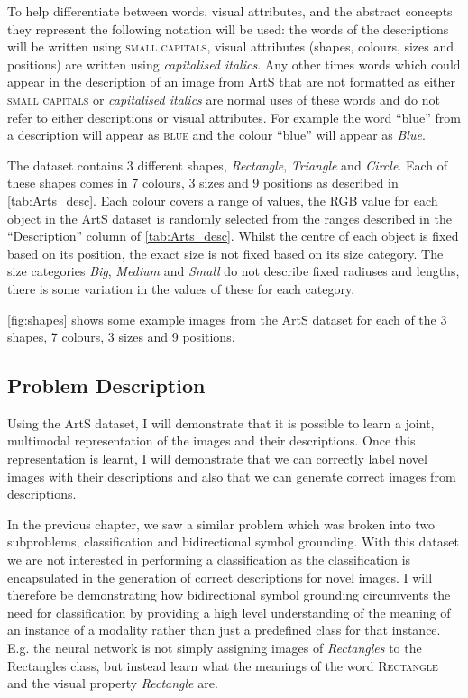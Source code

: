 To help differentiate between words, visual attributes, and the abstract concepts they represent the following notation will be used: the words of the descriptions will be written using \textsc{small capitals}, visual attributes (shapes, colours, sizes and positions) are written using \textit{capitalised italics}. Any other times words which could appear in the description of an image from ArtS that are not formatted as either \textsc{small capitals} or \textit{capitalised italics} are normal uses of these words and do not refer to either descriptions or visual attributes.
For example the word ``blue'' from a description will appear as \textsc{blue} and the colour ``blue'' will appear as \textit{Blue}. 


The dataset contains 3 different shapes, \textit{Rectangle}, \textit{Triangle} and \textit{Circle}. Each of these shapes comes in 7 colours, 3 sizes and 9 positions as described in \autoref{tab:Arts_desc}. Each colour covers a range of values, the RGB value for each object in the ArtS dataset is randomly selected from the ranges described in the ``Description'' column of \autoref{tab:Arts_desc}. Whilst the centre of each object is fixed based on its position, the exact size is not fixed based on its size category. The size categories \textit{Big}, \textit{Medium} and \textit{Small} do not describe fixed radiuses and lengths, there is some variation in the values of these for each category.


\autoref{fig:shapes} shows some example images from the ArtS dataset for each of the 3 shapes, 7 colours, 3 sizes and 9 positions.

\subsection{Problem Description}
Using the ArtS dataset, I will demonstrate that it is possible to learn a joint, multimodal representation of the images and their descriptions. Once this representation is learnt, I will demonstrate that we can correctly label novel images with their descriptions and also that we can generate correct images from descriptions.

In the previous chapter, we saw a similar problem which was broken into two subproblems, classification and bidirectional symbol grounding. With this dataset we are not interested in performing a classification as the classification is encapsulated in the generation of correct descriptions for novel images. I will therefore be demonstrating how bidirectional symbol grounding circumvents the need for classification by providing a high level understanding of the meaning of an instance of a modality rather than just a predefined class for that instance. E.g. the neural network is not simply assigning images of \textit{Rectangles} to the Rectangles class, but instead learn what the meanings of the word \textsc{Rectangle} and the visual property \textit{Rectangle} are. 

